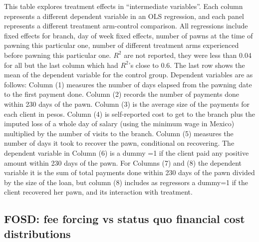 \documentclass[oneside,11pt]{article}
\begin{document}
\scriptsize {
\noindent This table explores treatment effects in ``intermediate variables''. Each column represents a different dependent variable in an OLS regression, and each panel represents a different treatment arm-control comparison. All regressions include fixed effects for branch, day of week fixed effects, number of pawns at the time of pawning this particular one, number of different treatment arms experienced before pawning this particular one. $R^2$ are not reported, they were less than 0.04 for all but the last column which had $R^2$'s close to 0.6. The last row shows the mean of the dependent variable for the control group. Dependent variables are as follows: Column (1) measures the number of days elapsed from the pawning date to the first payment done. Column (2) records the number of payments done within 230 days of the pawn. Column (3) is the average size of the payments for each client in pesos. Column (4) is self-reported cost to get to the branch plus the imputed loss of a whole day of salary (using the minimum wage in Mexico) multiplied by the number of visits to the branch. Column (5) measures the number of days it took to recover the pawn, conditional on recovering. The dependent variable in Column (6) is a dummy =1 if the client paid any positive amount within 230 days of the pawn. For Columns (7) and (8) the dependent variable it is the sum of total payments done within 230 days of the pawn divided by the size of the loan, but column (8) includes as regressors a dummy=1 if the client recovered her pawn, and its interaction with treatment.
}

\vspace{3ex}

\vspace{.3in}

\subsection{FOSD: fee forcing vs status quo financial cost distributions}
\end{document}
